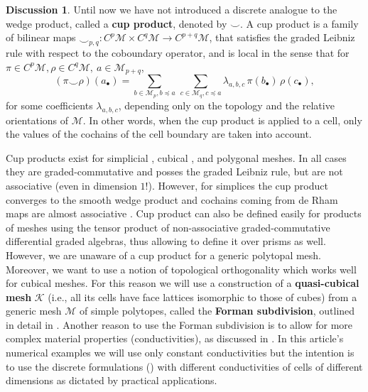 \documentclass{elsarticle}
\theoremstyle{definition}
\newtheorem{discussion}[theorem]{Discussion}
\newcommand{\newterm}[1]{\textbf{#1}}
\begin{document}
\begin{discussion}
  Until now we have not introduced a discrete analogue to the wedge product, called a \newterm{cup product}, denoted by $\smile$.
  A cup product is a family of bilinear maps $\smile_{p, q} \colon C^p \mathcal{M} \times C^q \mathcal{M} \to C^{p + q} \mathcal{M}$, that satisfies the graded Leibniz rule with respect to the coboundary operator, and is local in the sense that for $\pi \in C^p \mathcal{M}, \rho \in C^q \mathcal{M},\ a \in \mathcal{M}_{p + q}$,
  \begin{equation}
    (\pi \smile \rho)(a_\bullet) = \sum_{b \in \mathcal{M}_p, b \preceq a}\, \sum_{c \in \mathcal{M}_q, c \preceq a} \lambda_{a, b, c}\, \pi(b_\bullet)\, \rho(c_\bullet),
  \end{equation}
  for some coefficients $\lambda_{a, b, c}$, depending only on the topology and the relative orientations of $\mathcal{M}$.
  In other words, when the cup product is applied to a cell, only the values of the cochains of the cell boundary are taken into account.

  Cup products exist for simplicial \cite{wilson2007cochain}, cubical \cite{arnold2012discrete}, and polygonal \cite{ptackova2017discrete} meshes.
  In all cases they are graded-commutative and posses the graded Leibniz rule, but are not associative (even in dimension $1$!).
  However, for simplices the cup product converges to the smooth wedge product \cite[Theorem 5.4]{wilson2007cochain} and cochains coming from de Rham maps are almost associative \cite[Theorem 5.9]{wilson2007cochain}.
  Cup product can also be defined easily for products of meshes using the tensor product of non-associative graded-commutative differential graded algebras, thus allowing to define it over prisms as well.
  However, we are unaware of a cup product for a generic polytopal mesh.
  Moreover, we want to use a notion of topological orthogonality which works well for cubical meshes.
  For this reason we will use a construction of a \newterm{quasi-cubical mesh} $\mathcal{K}$ (i.e., all its cells have face lattices isomorphic to those of cubes) from a generic mesh $\mathcal{M}$ of simple polytopes, called the \newterm{Forman subdivision}, outlined in detail in \cite[Section 2]{berbatov2022diffusion}.
  Another reason to use the Forman subdivision is to allow for more complex material properties (conductivities), as discussed in \cite[Section 4]{berbatov2022diffusion}.
  In this article's numerical examples we will use only constant conductivities but the intention is to use the discrete formulations () with different conductivities of cells of different dimensions as dictated by practical applications.
\end{discussion}
\end{document}
